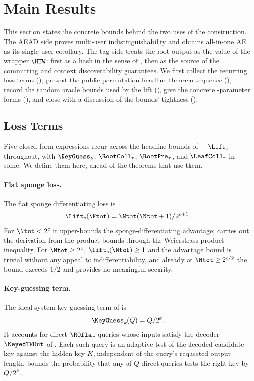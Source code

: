 \section{Main Results}
\label{sec:main-results}

This section states the concrete bounds behind the two uses of the
construction. The AEAD side proves multi-user indistinguishability and obtains
all-in-one AE as its single-user corollary. The tag side treats the root output
as the value of the wrapper $\HTW$: first as a hash in the sense of \cite{RS04},
then as the source of the \cite{BH22} committing and \cite{MLGR23} context
discoverability guarantees. We first collect the recurring loss terms
(), present the public-permutation headline theorem
sequence (), record the random oracle bounds used by the lift
(), give the concrete \TW{}-parameter forms
(), and close with a discussion of the
bounds' tightness ().

\subsection{Loss Terms}
\label{sec:loss-terms}

Five closed-form expressions recur across the headline bounds of
---$\Lift_c$ throughout, with $\KeyGuess_k$,
$\RootColl_\tau$, $\RootPre_\tau$, and $\LeafColl_\tau$ in some. We
define them here, ahead of the theorems that use them.

\paragraph{Flat sponge loss.}
The flat sponge differentiating loss is
\[
  \Lift_c(\Ntot) = \Ntot(\Ntot + 1) / 2^{c + 1}.
\]
For $\Ntot < 2^c$ it upper-bounds the \cite{BDPV08} sponge-differentiating
advantage;  carries out the derivation from the
\cite[Lemmas~4 and~5]{BDPV08} product bounds through the Weierstrass
product inequality. For $\Ntot \geq 2^c$, $\Lift_c(\Ntot) \geq 1$ and the
advantage bound is trivial without any appeal to indifferentiability, and
already at $\Ntot \geq 2^{c/2}$ the bound exceeds $1/2$ and provides no
meaningful security.

\paragraph{Key-guessing term.}
The ideal system key-guessing term of \cite{BDPV11} is
\[
  \KeyGuess_k(Q) = Q / 2^k.
\]
It accounts for direct $\ROflat$ queries whose inputs satisfy the
decoder $\KeyedTWOut$ of . Each such query is an
adaptive test of the decoded candidate key against the hidden key $K$,
independent of the query's requested output length. 
bounds the probability that any of $Q$ direct queries tests the right
key by $Q / 2^k$.

